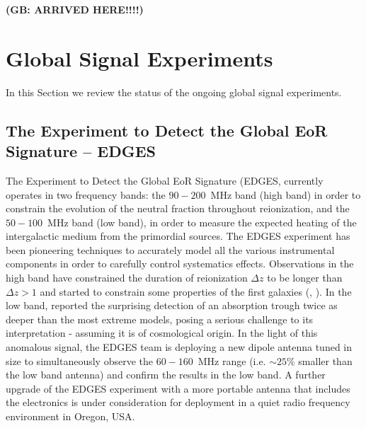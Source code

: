 {\bf (GB: ARRIVED HERE!!!!)}





\section{Global Signal Experiments}

In this Section we review the status of the ongoing global signal experiments. 

\subsection{The Experiment to Detect the Global EoR Signature -- EDGES}
The Experiment to Detect the Global EoR Signature (EDGES, \cite{bowman08} currently operates in two frequency bands: the $90-200$~MHz band (high band) in order to constrain the evolution of the neutral fraction throughout reionization, and the $50-100$~MHz band (low band), in order to measure the expected heating of the intergalactic medium from the primordial sources. 
The EDGES experiment has been pioneering techniques to accurately model all the various instrumental components in order to carefully control systematics effects. Observations in the high band have constrained the duration of reionization $\Delta z$ to be longer than $\Delta z >  1$ and started to constrain some properties of the first galaxies (\cite{monsalve17}, \cite{monsalve18}). In the low band, \cite{bowman18} reported the surprising detection of an absorption trough twice as deeper than the most extreme models, posing a serious challenge to its interpretation - assuming it is of cosmological origin. 
In the light of this anomalous signal, the EDGES team is deploying a new dipole antenna tuned in size to simultaneously observe the $60-160$~MHz range (i.e. $\sim 25\%$ smaller than the low band antenna) and confirm the results in the low band. A further upgrade of the EDGES experiment with a more portable antenna that includes the electronics is under consideration for deployment in a quiet radio frequency environment in Oregon, USA.




